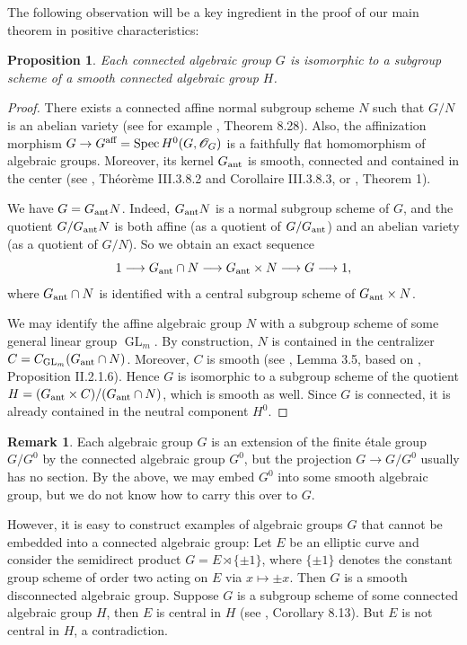 \documentclass[oneside, 12pt]{amsart}
\newtheorem{proposition}[theorem]{Proposition}
\theoremstyle{definition}
\newtheorem{remark}[theorem]{Remark}
\theoremstyle{remark}
\newcommand{\aff}{\text{\rm aff}}
\newcommand{\ant}{\text{\rm ant}}
\newcommand{\GL}{\operatorname{GL}}
\renewcommand{\O}{\mathscr{O}}
\newcommand{\ra}{\rightarrow}
\newcommand{\Spec}{\operatorname{Spec}}
\begin{document}
The following observation will be a key ingredient in 
the proof of our main theorem in positive characteristics:

\begin{proposition}
\label{prop:subgroup}
Each connected algebraic group $G$ is isomorphic to a subgroup scheme 
of a smooth connected algebraic group $H$.
\end{proposition}

\begin{proof}
There exists a connected 
affine normal subgroup scheme $N$ such that $G/N$ 
is an abelian variety (see for example \cite{Milne 2017}, 
Theorem 8.28). 
Also, the affinization 
morphism $G \to G^{\aff} = \Spec H^0(G,\O_G)$ 
is a faithfully flat homomorphism of algebraic groups. 
Moreover, its kernel $G_{\ant}$ is smooth, connected
and contained in the center  (see 
\cite{Demazure; Gabriel 1970},
Th\'eor\`eme III.3.8.2 and 
Corollaire III.3.8.3, or \cite{Brion 2017}, Theorem 1).

We have $G = G_{\ant} N$.
Indeed, $G_{\ant} N$ is a normal subgroup scheme
of $G$, and the quotient $G/G_{\ant} N$
is both affine (as a quotient of $G/G_{\ant}$)
and an abelian variety (as a quotient of $G/N$).
So we obtain an exact sequence 
\[ 1 \longrightarrow G_{\ant} \cap N
\longrightarrow G_{\ant} \times N 
\longrightarrow G \longrightarrow 1, \]
where $G_{\ant} \cap N$ is identified with a
central subgroup scheme of $G_{\ant} \times N$.

We may identify the affine algebraic group $N$ with a subgroup scheme
of some general linear group $\GL_m$. By construction, $N$ is contained 
in the centralizer 
$C = C_{\GL_m}(G_{\ant} \cap N)$.
Moreover, $C$ is smooth (see 
\cite{Herpel 2013}, Lemma 3.5,
based on \cite{Demazure; Gabriel 1970},
Proposition II.2.1.6).
Hence $G$ is isomorphic to a subgroup scheme
of the quotient 
$H=(G_{\ant} \times C)/(G_{\ant} \cap N)$,
which is smooth as well. Since $G$ is connected, 
it is already contained in the neutral component $H^0$.
\end{proof}


\begin{remark}
\label{rem:subgroup}
Each algebraic group $G$ is an extension of the finite \'etale group $G/G^0$
by the connected algebraic group $G^0$, but the projection $G\ra G/G^0$ 
usually has no section. By the above, we may embed $G^0$ into some
smooth algebraic group, but we do not know how to carry this over to $G$.

However, it is easy to construct
examples of   algebraic groups $G$  that cannot 
be embedded into  a connected algebraic group: Let $E$ be an elliptic 
curve and consider the semidirect product $G = E \rtimes \{ \pm 1 \}$, 
where $\{ \pm 1 \}$ denotes the constant group 
scheme of order two acting on $E$ via $x \mapsto \pm x$.  
Then $G$ is a smooth disconnected algebraic group. 
Suppose $G$ is a subgroup scheme of some 
connected algebraic group $H$, then $E$ is central 
in $H$ (see \cite{Milne 2017}, Corollary 8.13). 
But $E$ is not central in $H$, a contradiction.
\end{remark}
\end{document}

